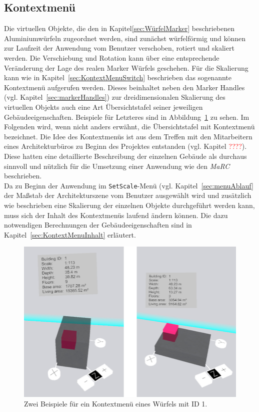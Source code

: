 \subsection{Kontextmenü}\label{sec:kontextMenu}
Die virtuellen Objekte, die den in Kapitel\ref{sec:WürfelMarker} beschriebenen Aluminiumwürfeln zugeordnet werden, sind zunächst würfelförmig und können zur Laufzeit der Anwendung vom Benutzer verschoben, rotiert und skaliert werden. Die Verschiebung und Rotation kann über eine entsprechende Veränderung der Lage des realen Marker Würfels geschehen. Für die Skalierung kann wie in Kapitel~\ref{sec:KontextMenuSwitch} beschrieben das sogenannte Kontextmenü aufgerufen werden. Dieses beinhaltet neben den Marker Handles (vgl. Kapitel~\ref{sec:markerHandles}) zur dreidimensionalen Skalierung des virtuellen Objekts auch eine Art Übersichtstafel seiner jeweiligen Gebäudeeigenschaften. Beispiele für Letzteres sind in Abbildung~\ref{fig:KontextmenuExamples} zu sehen. Im Folgenden wird, wenn nicht anders erwähnt, die Übersichtstafel mit Kontextmenü bezeichnet. Die Idee des Kontextmenüs ist aus dem Treffen mit den Mitarbeitern eines Architekturbüros zu Beginn des Projektes entstanden (vgl. Kapitel \textcolor{red}{????}). Diese hatten eine detaillierte Beschreibung der einzelnen Gebäude als durchaus sinnvoll und nützlich für die Umsetzung einer Anwendung wie den \textit{MaRC} beschrieben. \\
Da zu Beginn der Anwendung im \texttt{SetScale}-Menü (vgl. Kapitel~\ref{sec:menuAblauf} der Maßstab der Architekturszene vom Benutzer ausgewählt wird und zusätzlich wie beschrieben eine Skalierung der einzelnen Objekte durchgeführt werden kann, muss sich der Inhalt des Kontextmenüs laufend ändern können. Die dazu notwendigen Berechnungen der Gebäudeeigenschaften sind in Kapitel~\ref{sec:KontextMenuInhalt} erläutert. 

\begin{figure}[H]
	\centering
	\includegraphics[scale=.3]{Bilder/Eigene Fotos/KontextMenue.jpg}
	\caption{Zwei Beispiele für ein Kontextmenü eines Würfels mit ID 1.}
	\label{fig:KontextmenuExamples}
\end{figure}

